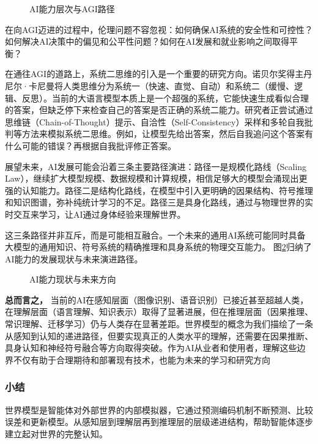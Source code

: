 \begin{figure}[H]
\centering
{}
\caption{AI能力层次与AGI路径}
\label{fig:ch2_2_39}
\end{figure}

在向AGI迈进的过程中，伦理问题不容忽视：如何确保AI系统的安全性和可控性？如何解决AI决策中的偏见和公平性问题？如何在AI发展和就业影响之间取得平衡？

在通往AGI的道路上，系统二思维的引入是一个重要的研究方向。诺贝尔奖得主丹尼尔·卡尼曼将人类思维分为系统一（快速、直觉、自动）和系统二（缓慢、逻辑、反思）。当前的大语言模型本质上是一个超强的系统，它能快速生成看似合理的答案，但缺乏停下来检查自己的答案是否正确的系统二能力。研究者正尝试通过思维链（Chain-of-Thought）提示、自洽性（Self-Consistency）采样和多轮自我批判等方法来模拟系统二思维。例如，让模型先给出答案，然后自我追问这个答案有什么可能的错误？再根据自我批评修正答案。



展望未来，AI发展可能会沿着三条主要路径演进：路径一是规模化路线（Scaling Law），继续扩大模型规模、数据规模和计算规模，相信足够大的模型会涌现出更强的认知能力。路径二是结构化路线，在模型中引入更明确的因果结构、符号推理和知识图谱，弥补纯统计学习的不足。路径三是具身化路线，通过与物理世界的实时交互来学习，让AI通过身体经验来理解世界。

这三条路径并非互斥，而是可能相互融合。一个未来的通用AI系统可能同时具备大模型的通用知识、符号系统的精确推理和具身系统的物理交互能力。
图\ref{fig:ch2_2_40}归纳了AI能力的发展现状与未来演进路径。

\begin{figure}[H]
\centering
{}
\caption{AI能力现状与未来方向}
\label{fig:ch2_2_40}
\end{figure}
\textbf{总而言之，} 当前的AI在感知层面（图像识别、语音识别）已接近甚至超越人类，在理解层面（语言理解、知识表示）取得了显著进展，但在推理层面（因果推理、常识理解、迁移学习）仍与人类存在显著差距。世界模型的概念为我们描绘了一条从感知到认知的递进路径，但要实现真正的人类水平的理解，还需要在因果推断、具身认知和神经符号融合等方向取得突破。作为AI从业者和使用者，理解这些边界不仅有助于合理期待和部署现有技术，也能为未来的学习和研究方向


\subsubsection*{小结}

世界模型是智能体对外部世界的内部模拟器，它通过预测编码机制不断预测、比较误差和更新模型。从感知层到理解层再到推理层的层级递进结构，帮助智能体逐步建立起对世界的完整认知。

